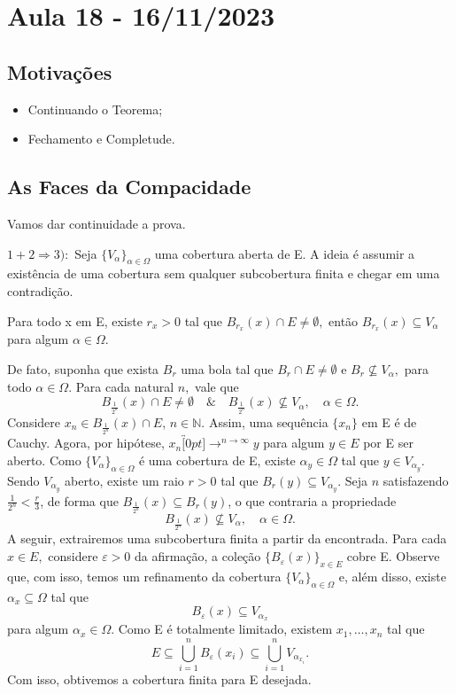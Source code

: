 \documentclass[metric_notes.tex]{subfiles}
\begin{document}
\section{Aula 18 - 16/11/2023}
\subsection{Motivações}
\begin{itemize}
	\item Continuando o Teorema;
	\item Fechamento e Completude.
\end{itemize}
\subsection{As Faces da Compacidade}
Vamos dar continuidade a prova.
\begin{proof*}
	\(1 + 2 \Rightarrow 3):\) Seja \(\{V_{\alpha }\}_{\alpha \in \Omega }\) uma cobertura aberta de E. A ideia
	é assumir a existência de uma cobertura sem qualquer subcobertura finita e chegar em uma contradição.

	\begin{claim*}Para todo x em E, existe \(r_{x}> 0\) tal que \(B_{r_{x}}(x)\cap E \neq\emptyset, \) então
		\(B_{r_{x}}(x)\subseteq V_{\alpha }\) para algum \(\alpha \in \Omega \).
	\end{claim*}

	De fato, suponha que exista \(B_{r}\) uma bola tal que \(B_{r}\cap E \neq\emptyset\) e \(B_{r}\not\subseteq V_{\alpha },\) para todo
	\(\alpha \in \Omega \). Para cada natural \(n,\) vale que
	\[
		B_{\frac{1}{2^{n}}}(x)\cap E \neq\emptyset\quad\&\quad B_{\frac{1}{2^{n}}}(x)\not\subseteq V_{\alpha }, \quad\alpha \in \Omega .
	\]
	Considere \(x_{n}\in B_{\frac{1}{2^{n}}}(x)\cap E\), \(n\in \mathbb{N}.\) Assim, uma sequência \(\{x_{n}\}\) em E é
	de Cauchy. Agora, por hipótese, \(x_{n}\overbracket[0pt]{\longrightarrow}^{n\to \infty}y\) para algum \(y\in E\) por
	E ser aberto. Como \(\{V_{\alpha }\}_{\alpha \in \Omega }\) é uma cobertura de E, existe \(\alpha_{y} \in \Omega \) tal que
	\(y\in V_{\alpha_{y}}\). Sendo \(V_{\alpha_{y}}\) aberto, existe um raio \(r > 0\) tal que \(B_{r}(y)\subseteq V_{\alpha _{y}}.\)
	Seja \(n\) satisfazendo \(\frac{1}{2^{n}} < \frac{r}{3}\), de forma que \(B_{\frac{1}{2^{n}}}(x)\subseteq B_{r}(y)\), o que
	contraria a propriedade
	\[
		B_{\frac{1}{2^{n}}}(x)\not\subseteq V_{\alpha }, \quad\alpha \in \Omega .
	\]
	A seguir, extrairemos uma subcobertura finita a partir da encontrada. Para cada \(x\in E, \) considere
	\(\varepsilon > 0\) da afirmação, a coleção \(\{B_{\varepsilon }(x)\}_{x\in E}\) cobre E. Observe que, com isso,
	temos um refinamento da cobertura \(\{V_{\alpha }\}_{\alpha \in \Omega }\) e, além disso, existe \(\alpha_{x}\subseteq \Omega \)
	tal que
	\[
		B_{\varepsilon }(x)\subseteq V_{\alpha_{x}}
	\]
	para algum \(\alpha_{x}\in \Omega \). Como E é totalmente limitado, existem \(x_{1}, \dotsc, x_{n}\) tal que
	\[
		E\subseteq \bigcup_{i=1}^{n}B_{\varepsilon }(x_{i})\subseteq \bigcup_{i=1}^{n}V_{\alpha_{x_{i}}}.
	\]
	Com isso, obtivemos a cobertura finita para E desejada. \qedsymbol
\end{proof*}
\end{document}
